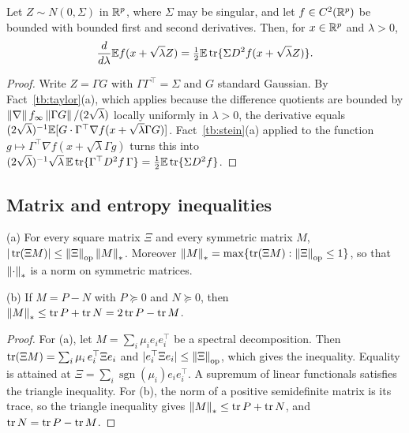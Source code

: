 \begin{fact}\label{tb:heat}
Let \(Z\sim N(0,\Sigma)\) in \(\mathbb R^p\), where \(\Sigma\) may be singular, and
let \(f\in C^2(\mathbb R^p)\) be bounded with bounded first and second derivatives.
Then, for \(x\in\mathbb R^p\) and \(\lambda>0\),
\[
 \frac d{d\lambda}\mathbb E f(x+\sqrt\lambda Z)
 =\tfrac12\mathbb E\operatorname{tr}\{\Sigma D^2f(x+\sqrt\lambda Z)\}.
\]
\end{fact}

\begin{proof}
Write \(Z=\Gamma G\) with \(\Gamma\Gamma^\top=\Sigma\) and \(G\) standard
Gaussian. By Fact~\ref{tb:taylor}(a), which applies because the difference
quotients are bounded by \(\left\lVert\nabla\right\rVert f_\infty\left\lVert\Gamma G\right\rVert/(2\sqrt\lambda)\)
locally uniformly in \(\lambda>0\), the derivative equals
\((2\sqrt\lambda)^{-1}\mathbb E[G\cdot\Gamma^\top\nabla f(x+\sqrt\lambda\Gamma G)]\).
Fact~\ref{tb:stein}(a) applied to the function \(g\mapsto
\Gamma^\top\nabla f(x+\sqrt\lambda\Gamma g)\) turns this into
\((2\sqrt\lambda)^{-1}\sqrt\lambda\,\mathbb E\operatorname{tr}\{\Gamma^\top D^2f\,\Gamma\}
=\frac12\mathbb E\operatorname{tr}\{\Sigma D^2f\}\).
\end{proof}


\subsection{Matrix and entropy inequalities}\label{tb:sec:matrix}

\begin{fact}\label{tb:nuclear}
(a) For every square matrix \(\Xi\) and every symmetric matrix \(M\),
\(|\operatorname{tr}(\Xi M)|\le\left\lVert\Xi\right\rVert_{\mathrm{op}}\left\lVert M\right\rVert_*\). Moreover
\(\left\lVert M\right\rVert_*=\max\{\operatorname{tr}(\Xi M):\left\lVert\Xi\right\rVert_{\mathrm{op}}\le1\}\), so that \(\left\lVert\cdot\right\rVert_*\) is
a norm on symmetric matrices.

(b) If \(M=P-N\) with \(P\succeq0\) and \(N\succeq0\), then
\(\left\lVert M\right\rVert_*\le\operatorname{tr} P+\operatorname{tr} N=2\operatorname{tr} P-\operatorname{tr} M\).
\end{fact}

\begin{proof}
For (a), let \(M=\sum_i\mu_ie_ie_i^\top\) be a spectral decomposition. Then
\(\operatorname{tr}(\Xi M)=\sum_i\mu_i\,e_i^\top\Xi e_i\) and \(|e_i^\top\Xi e_i|\le
\left\lVert\Xi\right\rVert_{\mathrm{op}}\), which gives the inequality. Equality is attained at
\(\Xi=\sum_i\operatorname{sgn}(\mu_i)e_ie_i^\top\). A supremum of linear
functionals satisfies the triangle inequality. For (b), the norm of a
positive semidefinite matrix is its trace, so the triangle inequality gives
\(\left\lVert M\right\rVert_*\le\operatorname{tr} P+\operatorname{tr} N\), and \(\operatorname{tr} N=\operatorname{tr} P-\operatorname{tr} M\).
\end{proof}

